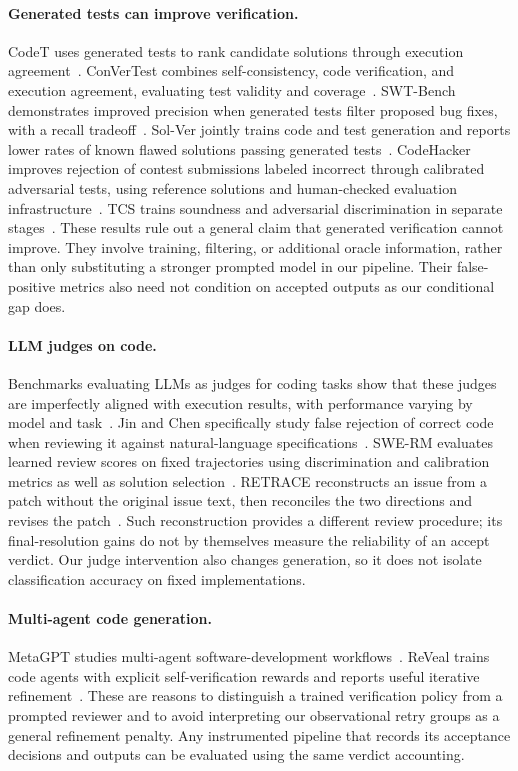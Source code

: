 \paragraph{Generated tests can improve verification.}
CodeT uses generated tests to rank candidate solutions through execution
agreement~\cite{chen2023codet}. ConVerTest combines self-consistency, code verification, and
execution agreement, evaluating test validity and coverage~\cite{convertest2026}.
SWT-Bench demonstrates improved precision when generated tests filter proposed
bug fixes, with a recall tradeoff~\cite{mundler2024swtbench}. Sol-Ver jointly trains
code and test generation and reports lower rates of known flawed solutions passing
generated tests~\cite{lin2025solver}. CodeHacker improves rejection of contest
submissions labeled incorrect through calibrated adversarial tests, using reference solutions and
human-checked evaluation infrastructure~\cite{shi2026codehacker}. TCS trains soundness
and adversarial discrimination in separate stages~\cite{xu2026tcs}. These results rule
out a general claim that generated verification cannot improve. They involve training,
filtering, or additional oracle information, rather than only substituting a stronger
prompted model in our pipeline. Their false-positive metrics also need not condition on
accepted outputs as our conditional gap does.

\paragraph{LLM judges on code.}
Benchmarks evaluating LLMs as judges for coding tasks show that these judges are imperfectly
aligned with execution results, with performance varying by model and task~\cite{jiang2025codejudgebench}.
Jin and Chen specifically study false rejection of correct code when reviewing it against
natural-language specifications~\cite{verifyfailures2025}. SWE-RM evaluates learned
review scores on fixed trajectories using discrimination and calibration metrics as well
as solution selection~\cite{shum2025swerm}. RETRACE reconstructs an issue from a patch
without the original issue text, then reconciles the two directions and revises the
patch~\cite{li2026retrace}. Such reconstruction provides a different review procedure;
its final-resolution gains do not by themselves measure the reliability of an accept verdict.
Our judge intervention also changes generation, so it does not isolate classification
accuracy on fixed implementations.

\paragraph{Multi-agent code generation.}
MetaGPT studies multi-agent software-development workflows~\cite{hong2024metagpt}.
ReVeal trains code agents with explicit self-verification rewards and reports useful
iterative refinement~\cite{jin2025reveal}. These are reasons to distinguish a trained
verification policy from a prompted reviewer and to avoid interpreting our observational
retry groups as a general refinement penalty. Any instrumented pipeline that records its
acceptance decisions and outputs can be evaluated using the same verdict accounting.

